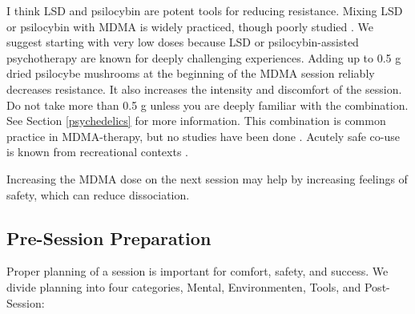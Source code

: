 \documentclass[12pt,letterpaper]{article}
\begin{document}
 

I think LSD and psilocybin are potent tools for reducing resistance.  Mixing LSD or psilocybin with MDMA is widely practiced, though poorly studied \cite{zeifmanCo-use}. We suggest starting with very low doses because LSD or psilocybin-assisted psychotherapy are known for deeply challenging experiences. Adding up to 0.5 g dried psilocybe mushrooms at the beginning of the MDMA session reliably decreases resistance. It also increases the intensity and discomfort of the session. Do not take more than 0.5 g unless you are deeply familiar with the combination. See Section \ref{psychedelics} for more information. This combination is common practice in MDMA-therapy, but no studies have been done \cite{colemanPsychedelicPsychotherapy}. Acutely safe co-use is known from recreational contexts \cite{zeifmanCo-use}. 

Increasing the MDMA dose on the next session may help by increasing feelings of safety, which can reduce dissociation.
\subsection{Pre-Session Preparation}
\label{prep}
Proper planning of a session is important for comfort, safety, and success. We divide planning into four categories, Mental, Environmenten, Tools, and Post-Session:

\vspace{\baselineskip}
\end{document}
